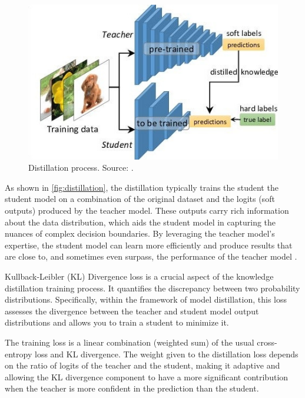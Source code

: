 \begin{figure}[hbt]
    \centering
    \includegraphics[width=0.7\linewidth]{figs/distillation.jpg}
    \caption{Distillation process. Source: \cite{kd_simplified}.}
    \label{fig:distillation}
\end{figure}

As shown in \autoref{fig:distillation}, the distillation typically trains the student the student model on a combination of the original dataset and the logits (soft outputs) produced by the teacher model. These outputs carry rich information about the data distribution, which aids the student model in capturing the nuances of complex decision boundaries. By leveraging the teacher model's expertise, the student model can learn more efficiently and produce results that are close to, and sometimes even surpass, the performance of the teacher model \cite{distilling}.

Kullback-Leibler (KL) Divergence loss \cite{kl} is a crucial aspect of the knowledge distillation training process. It quantifies the discrepancy between two probability distributions. Specifically, within the framework of model distillation, this loss assesses the divergence between the teacher and student model output distributions and allows you to train a student to minimize it.

The training loss is a linear combination (weighted sum) of the usual cross-entropy loss and KL divergence. The weight given to the distillation loss depends on the ratio of logits of the teacher and the student, making it adaptive and allowing the KL divergence component to have a more significant contribution when the teacher is more confident in the prediction than the student.


